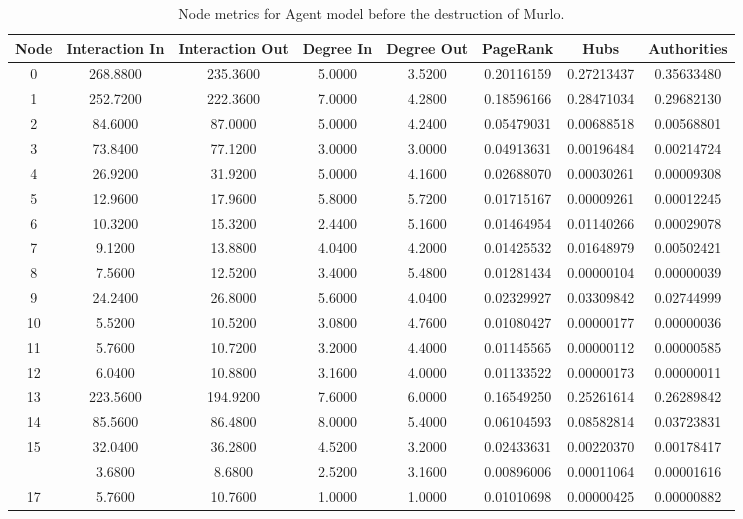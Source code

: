 \documentclass[12pt,a4paper]{thesis}
\begin{document}
\begin{table}[H]
\centering
\caption{Node metrics for Agent model before the destruction of Murlo.}
\tiny
\begin{tabular}{|c|c|c|c|c|c|c|c|}
\hline	Node	&	Interaction In	&	Interaction Out	&	Degree In	&	Degree Out	&	PageRank	&	Hubs	&	Authorities	\\
\hline	0	&	268.8800	&	235.3600	&	5.0000	&	3.5200	&	0.20116159	&	0.27213437	&	0.35633480	\\
\hline	1	&	252.7200	&	222.3600	&	7.0000	&	4.2800	&	0.18596166	&	0.28471034	&	0.29682130	\\
\hline	2	&	84.6000	&	87.0000	&	5.0000	&	4.2400	&	0.05479031	&	0.00688518	&	0.00568801	\\
\hline	3	&	73.8400	&	77.1200	&	3.0000	&	3.0000	&	0.04913631	&	0.00196484	&	0.00214724	\\
\hline	4	&	26.9200	&	31.9200	&	5.0000	&	4.1600	&	0.02688070	&	0.00030261	&	0.00009308	\\
\hline	5	&	12.9600	&	17.9600	&	5.8000	&	5.7200	&	0.01715167	&	0.00009261	&	0.00012245	\\
\hline	6	&	10.3200	&	15.3200	&	2.4400	&	5.1600	&	0.01464954	&	0.01140266	&	0.00029078	\\
\hline	7	&	9.1200	&	13.8800	&	4.0400	&	4.2000	&	0.01425532	&	0.01648979	&	0.00502421	\\
\hline	8	&	7.5600	&	12.5200	&	3.4000	&	5.4800	&	0.01281434	&	0.00000104	&	0.00000039	\\
\hline	9	&	24.2400	&	26.8000	&	5.6000	&	4.0400	&	0.02329927	&	0.03309842	&	0.02744999	\\
\hline	10	&	5.5200	&	10.5200	&	3.0800	&	4.7600	&	0.01080427	&	0.00000177	&	0.00000036	\\
\hline	11	&	5.7600	&	10.7200	&	3.2000	&	4.4000	&	0.01145565	&	0.00000112	&	0.00000585	\\
\hline	12	&	6.0400	&	10.8800	&	3.1600	&	4.0000	&	0.01133522	&	0.00000173	&	0.00000011	\\
\hline	13	&	223.5600	&	194.9200	&	7.6000	&	6.0000	&	0.16549250	&	0.25261614	&	0.26289842	\\
\hline	14	&	85.5600	&	86.4800	&	8.0000	&	5.4000	&	0.06104593	&	0.08582814	&	0.03723831	\\
\hline	15	&	32.0400	&	36.2800	&	4.5200	&	3.2000	&	0.02433631	&	0.00220370	&	0.00178417	\\
\rowcolor{yellow}
\hline	16	&	3.6800	&	8.6800	&	2.5200	&	3.1600	&	0.00896006	&	0.00011064	&	0.00001616	\\
\hline	17	&	5.7600	&	10.7600	&	1.0000	&	1.0000	&	0.01010698	&	0.00000425	&	0.00000882	\\

\end{tabular}
\end{table}
\end{document}
